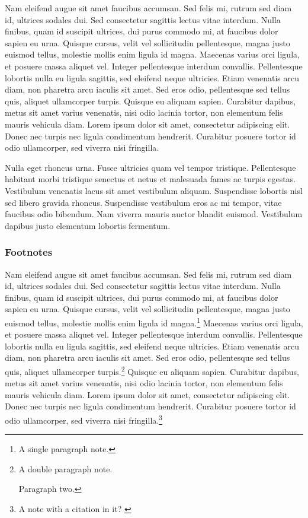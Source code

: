 \documentclass{article}
\begin{document}
Nam eleifend augue sit amet faucibus accumsan. Sed felis mi, rutrum sed diam id, ultrices sodales dui. Sed consectetur sagittis lectus vitae interdum. Nulla finibus, quam id suscipit ultrices, dui purus commodo mi, at faucibus dolor sapien eu urna. Quisque cursus, velit vel sollicitudin pellentesque, magna justo euismod tellus, molestie mollis enim ligula id magna. \autocite{https://doi.org/10.15463/rec.799967328} Maecenas varius orci ligula, et posuere massa aliquet vel. Integer pellentesque interdum convallis. Pellentesque lobortis nulla eu ligula sagittis, sed eleifend neque ultricies. Etiam venenatis arcu diam, non pharetra arcu iaculis sit amet. \autocite{Williams_2020} Sed eros odio, pellentesque sed tellus quis, aliquet ullamcorper turpis. Quisque eu aliquam sapien. Curabitur dapibus, metus sit amet varius venenatis, nisi odio lacinia tortor, non elementum felis mauris vehicula diam. Lorem ipsum dolor sit amet, consectetur adipiscing elit. Donec nec turpis nec ligula condimentum hendrerit. Curabitur posuere tortor id odio ullamcorper, sed viverra nisi fringilla. \autocite{https://doi.org/10.15463/rec.612893388}


Nulla eget rhoncus urna. Fusce ultricies quam vel tempor tristique. Pellentesque habitant morbi tristique senectus et netus et malesuada fames ac turpis egestas. Vestibulum venenatis lacus sit amet vestibulum aliquam. Suspendisse lobortis nisl sed libero gravida rhoncus. Suspendisse vestibulum eros ac mi tempor, vitae faucibus odio bibendum. Nam viverra mauris auctor blandit euismod. Vestibulum dapibus justo elementum lobortis fermentum.


\subsubsection{Footnotes}\label{H7237703}



Nam eleifend augue sit amet faucibus accumsan. Sed felis mi, rutrum sed diam id, ultrices sodales dui. Sed consectetur sagittis lectus vitae interdum. Nulla finibus, quam id suscipit ultrices, dui purus commodo mi, at faucibus dolor sapien eu urna. Quisque cursus, velit vel sollicitudin pellentesque, magna justo euismod tellus, molestie mollis enim ligula id magna.\footnote{A single paragraph note.} Maecenas varius orci ligula, et posuere massa aliquet vel. Integer pellentesque interdum convallis. Pellentesque lobortis nulla eu ligula sagittis, sed eleifend neque ultricies. Etiam venenatis arcu diam, non pharetra arcu iaculis sit amet. Sed eros odio, pellentesque sed tellus quis, aliquet ullamcorper turpis.\footnote{A double paragraph note.


Paragraph two.} Quisque eu aliquam sapien. Curabitur dapibus, metus sit amet varius venenatis, nisi odio lacinia tortor, non elementum felis mauris vehicula diam. Lorem ipsum dolor sit amet, consectetur adipiscing elit. Donec nec turpis nec ligula condimentum hendrerit. Curabitur posuere tortor id odio ullamcorper, sed viverra nisi fringilla.\footnote{A note with a citation in it? \autocite{https://doi.org/10.15463/rec.612893388}}
\end{document}
